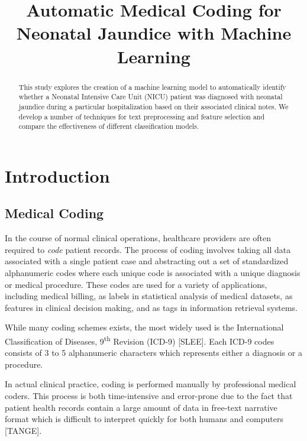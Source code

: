 \documentclass[conference]{IEEEtran}
\begin{document}
\title{Automatic Medical Coding for Neonatal Jaundice with Machine Learning
}


\author{
}

\maketitle

\begin{abstract}
This study explores the creation of a machine learning model to automatically identify whether a Neonatal Intensive Care Unit (NICU) patient was diagnosed with neonatal jaundice during a particular hospitalization based on their associated clinical notes. We develop a number of techniques for text preprocessing and feature selection and compare the effectiveness of different classification models. 
\end{abstract}

\section{Introduction}
\subsection{Medical Coding}\label{AA}
In the course of normal clinical operations, healthcare providers are often required to \textit{code} patient records. The process of coding involves taking all data associated with a single patient case and abstracting out a set of standardized alphanumeric codes where each unique code is associated with a unique diagnosis or medical procedure. These codes are used for a variety of applications, including medical billing, as labels in statistical analysis of medical datasets, as features in clinical decision making, and as tags in information retrieval systems. 

While many coding schemes exists, the most widely used is the International Classification of Diseases, 9\textsuperscript{th} Revision (ICD-9) [SLEE]. Each ICD-9 codes consists of 3 to 5 alphanumeric characters which represents either a diagnosis or a procedure.

In actual clinical practice, coding is performed manually by professional medical coders. This process is both time-intensive and error-prone due to the fact that patient health records contain a large amount of data in free-text narrative format which is difficult to interpret quickly for both humans and computers [TANGE]. 
\end{document}
